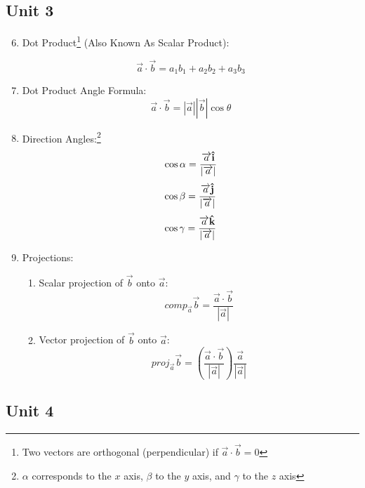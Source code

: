 \documentclass[12pt]{article}
\begin{document}
\subsection{Unit 3}

\begin{enumerate}
    \setcounter{enumi}{5}

  \item Dot Product\footnote{Two vectors are orthogonal (perpendicular) if $\overrightarrow{a}\cdot\overrightarrow{b}=0$} (Also Known As Scalar Product):

    $$\overrightarrow{a}\cdot\overrightarrow{b}=a_1b_1+a_2b_2+a_3b_3$$

  \item Dot Product Angle Formula:
    $$\overrightarrow{a}\cdot\overrightarrow{b}=|\overrightarrow{a}||\overrightarrow{b}|\cos\theta$$

  \item Direction Angles:\footnote{$\alpha$ corresponds to the $x$ axis, $\beta$ to the $y$ axis, and $\gamma$ to the $z$ axis}
    $$\cos\alpha=\frac{\overrightarrow{a}\bold{\hat{i}}}{|\overrightarrow{a}|}$$
    $$\cos\beta=\frac{\overrightarrow{a}\bold{\hat{j}}}{|\overrightarrow{a}|}$$
    $$\cos\gamma=\frac{\overrightarrow{a}\bold{\hat{k}}}{|\overrightarrow{a}|}$$

\item Projections:

  \begin{enumerate}

    \item Scalar projection of $\overrightarrow{b}$ onto $\overrightarrow{a}$:
      $$comp_{\overrightarrow{a}}\overrightarrow{b}=\frac{\overrightarrow{a}\cdot\overrightarrow{b}}{|\overrightarrow{a}|}$$

    \item Vector projection of $\overrightarrow{b}$ onto $\overrightarrow{a}$:
      $$proj_{\overrightarrow{a}}\overrightarrow{b}=\left(\frac{\overrightarrow{a}\cdot\overrightarrow{b}}{|\overrightarrow{a}|}\right)\frac{\overrightarrow{a}}{|\overrightarrow{a}|}$$
  \end{enumerate}

\end{enumerate}

\subsection{Unit 4}
\end{document}
